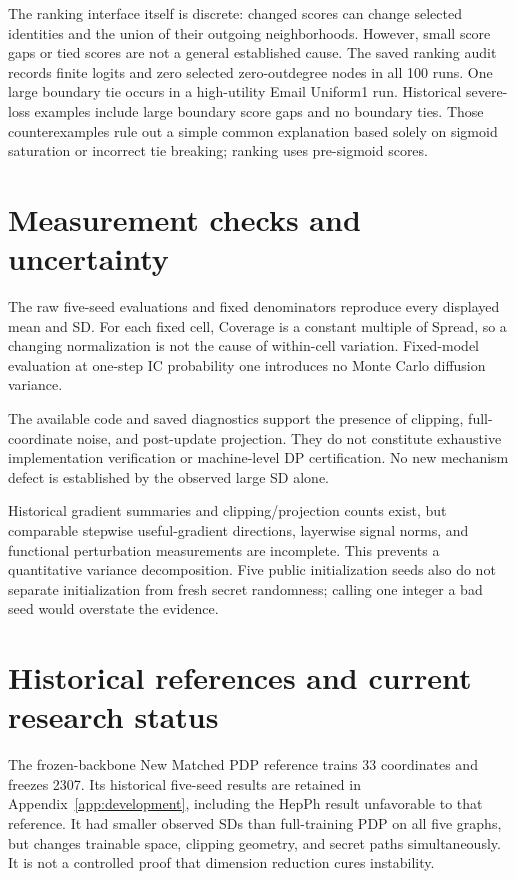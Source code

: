The ranking interface itself is discrete: changed scores can change selected identities and the union of their outgoing neighborhoods. However, small score gaps or tied scores are not a general established cause. The saved ranking audit records finite logits and zero selected zero-outdegree nodes in all 100 runs. One large boundary tie occurs in a high-utility Email Uniform1 run. Historical severe-loss examples include large boundary score gaps and no boundary ties. Those counterexamples rule out a simple common explanation based solely on sigmoid saturation or incorrect tie breaking; ranking uses pre-sigmoid scores.

\section{Measurement checks and uncertainty}
The raw five-seed evaluations and fixed denominators reproduce every displayed mean and SD. For each fixed cell, Coverage is a constant multiple of Spread, so a changing normalization is not the cause of within-cell variation. Fixed-model evaluation at one-step IC probability one introduces no Monte Carlo diffusion variance.

The available code and saved diagnostics support the presence of clipping, full-coordinate noise, and post-update projection. They do not constitute exhaustive implementation verification or machine-level DP certification. No new mechanism defect is established by the observed large SD alone.

Historical gradient summaries and clipping/projection counts exist, but comparable stepwise useful-gradient directions, layerwise signal norms, and functional perturbation measurements are incomplete. This prevents a quantitative variance decomposition. Five public initialization seeds also do not separate initialization from fresh secret randomness; calling one integer a bad seed would overstate the evidence.

\section{Historical references and current research status}
The frozen-backbone New Matched PDP reference trains 33 coordinates and freezes 2307. Its historical five-seed results are retained in Appendix~\ref{app:development}, including the HepPh result unfavorable to that reference. It had smaller observed SDs than full-training PDP on all five graphs, but changes trainable space, clipping geometry, and secret paths simultaneously. It is not a controlled proof that dimension reduction cures instability.

